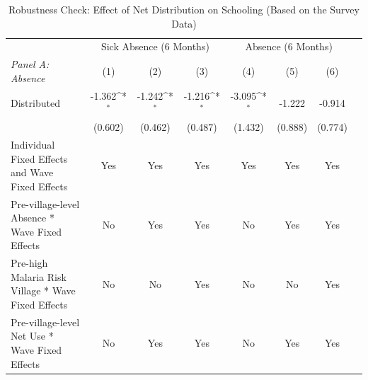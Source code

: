 \documentclass[fleqn,11pt]{article}
\newcommand{\sym}[1]{\rlap{$#1$}}
\def\sym#1{\ifmmode^{#1}\else\(^{#1}\)\fi
}
\begin{document}
\begin{table}[h]
\caption{Robustness Check: Effect of Net Distribution on Schooling (Based on the Survey Data)}
\label{t:absence3rd_questionnaire_child_app}\centering
\begin{adjustbox}{max width=\textwidth}
\begin{threeparttable}
\begin{tabular}{l*{7}{c}}
\hline\hline
          &\multicolumn{3}{c}{Sick Absence (6 Months)}&\multicolumn{3}{c}{Absence (6 Months)}\\   \cmidrule(lr){2-4} \cmidrule(lr){5-7}
            \textit{Panel A: Absence}                  &\multicolumn{1}{c}{(1)}&\multicolumn{1}{c}{(2)}&\multicolumn{1}{c}{(3)}&\multicolumn{1}{c}{(4)}&\multicolumn{1}{c}{(5)}&\multicolumn{1}{c}{(6)}\\

\hline
Distributed         &        -1.362\sym{*}  &      -1.242\sym{*}  &      -1.216\sym{*} & -3.095\sym{*}  &      -1.222         &      -0.914      \\
 &       (0.602)         &       (0.462)         &       (0.487)         &       (1.432)         &       (0.888)         &       (0.774)         \\

Individual Fixed Effects and Wave Fixed Effects &         Yes         &         Yes         &         Yes         &         Yes         &         Yes         &         Yes         \\

Pre-village-level Absence * Wave Fixed Effects&          No         &         Yes         &         Yes         &          No         &         Yes         &         Yes         \\

Pre-high Malaria Risk Village * Wave Fixed Effects&          No         &          No         &         Yes         &          No         &          No         &         Yes         \\

Pre-village-level Net Use * Wave Fixed Effects&          No         &          Yes         &         Yes        &     No         &          Yes         &         Yes       \\


\end{tabular}
\end{threeparttable}
\end{adjustbox}
\end{table}
\end{document}
